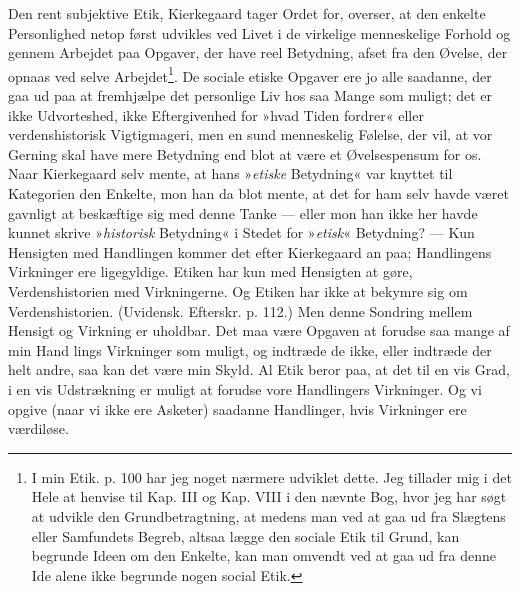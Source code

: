\documentclass[12pt,a4paper,openany]{book}
\newcommand{\opage}[1]{\marginnote{\footnotesize\textit{[#1]}}}
\begin{document}
Den rent subjektive Etik, Kierkegaard tager Ordet
for, overser, at den enkelte Personlighed netop først udvikles
ved Livet i de virkelige menneskelige Forhold og
gennem Arbejdet paa Opgaver, der have reel Betydning,
afset fra den Øvelse, der opnaas ved selve Arbejdet\footnote{I min Etik. p. 100 har jeg noget nærmere udviklet dette. Jeg tillader mig i det Hele at henvise til Kap. III og Kap. VIII i den nævnte Bog, hvor jeg har søgt at udvikle den Grundbetragtning, at medens man ved at gaa ud fra Slægtens eller Samfundets Begreb, altsaa lægge den sociale Etik til Grund, kan begrunde Ideen om den Enkelte, kan man omvendt ved at gaa ud fra denne Ide alene ikke begrunde nogen social Etik.}.
De sociale etiske Opgaver ere jo alle saadanne, der gaa
ud paa at fremhjælpe det personlige Liv hos saa Mange
som muligt; det er ikke Udvorteshed, ikke Eftergivenhed
for »hvad Tiden fordrer« eller verdenshistorisk Vigtigmageri,
men en sund menneskelig Følelse, der vil, at vor
Gerning skal have mere Betydning end blot at være et
Øvelsespensum for os. Naar Kierkegaard selv mente, at
hans »\textit{etiske} Betydning« var knyttet til Kategorien den
Enkelte, mon han da blot mente, at det for ham selv
havde været gavnligt at beskæftige sig med denne Tanke
--- eller mon han ikke her havde kunnet skrive »\textit{historisk}
Betydning« i Stedet for »\textit{etisk}« Betydning? --- Kun Hensigten
med Handlingen kommer det efter Kierkegaard
an paa; Handlingens Virkninger ere ligegyldige. Etiken
har kun med Hensigten at gøre, Verdenshistorien med
Virkningerne. Og Etiken har ikke at bekymre sig om
Verdenshistorien. (Uvidensk. Efterskr. p. 112.) Men denne
Sondring mellem Hensigt og Virkning er uholdbar. Det
maa være Opgaven at forudse saa mange af min Hand%
\opage{106}lings Virkninger som muligt, og indtræde de ikke, eller
indtræde der helt andre, saa kan det være min Skyld.
Al Etik beror paa, at det til en vis Grad, i en vis Udstrækning
er muligt at forudse vore Handlingers Virkninger.
Og vi opgive (naar vi ikke ere Asketer) saadanne
Handlinger, hvis Virkninger ere værdiløse.
\end{document}
